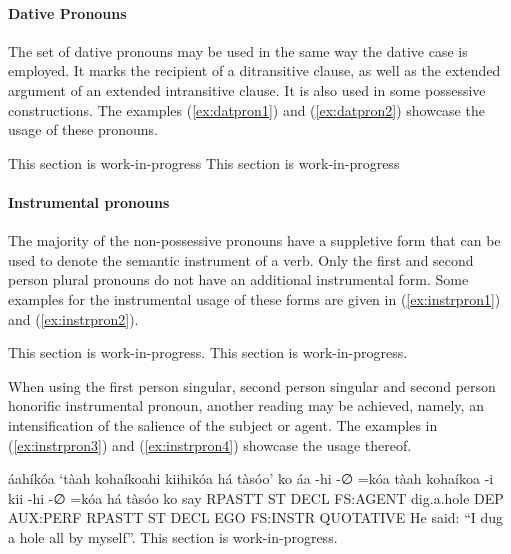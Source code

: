 \documentclass[a4paper, 12pt, oneside]{memoir}
\begin{document}
\paragraph{Dative Pronouns}
The set of dative pronouns may be used in the same way the dative case is employed. It marks the recipient of a ditransitive clause, as well as the extended argument of an extended intransitive clause. It is also used in some possessive constructions. The examples (\ref{ex:datpron1}) and (\ref{ex:datpron2}) showcase the usage of these pronouns.
\begin{examples}
    \ex \label{ex:datpron1}
    This section is work-in-progress
    \ex \label{ex:datpron2}
    This section is work-in-progress
    \end{examples}
\paragraph{Instrumental pronouns}
The majority of the non-possessive pronouns have a suppletive form that can be used to denote the semantic instrument of a verb. Only the first and second person plural pronouns do not have an additional instrumental form. Some examples for the instrumental usage of these forms are given in (\ref{ex:instrpron1}) and (\ref{ex:instrpron2}).
\begin{examples}
\ex This section is work-in-progress. \label{ex:instrpron1}
\ex This section is work-in-progress. \label{ex:instrpron2}
\end{examples}
When using the first person singular, second person singular and second person honorific instrumental pronoun, another reading may be achieved, namely, an intensification of the salience of the subject or agent. The examples in (\ref{ex:instrpron3}) and (\ref{ex:instrpron4}) showcase the usage thereof.
\begin{examples}
\ex \label{ex:instrpron3}
\words áahíkóa `tàah kohaíkoahi kiihikóa há tàsóo' ko
\bits áa -hi -∅ =kóa tàah kohaíkoa -i kii -hi -∅ =kóa há tàsóo ko
\gloss say RPASTT ST DECL FS:AGENT dig.a.hole  DEP AUX:PERF RPASTT ST DECL  EGO FS:INSTR QUOTATIVE
\tr He said: ``I dug a hole all by myself''. 
\ex This section is work-in-progress. \label{ex:instrpron4}
\end{examples}
\end{document}
